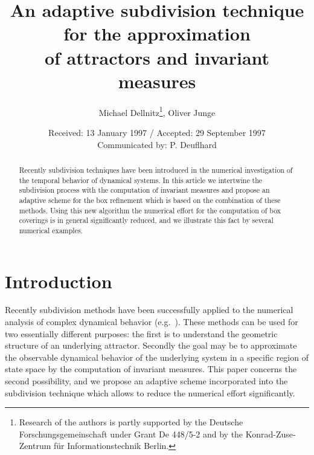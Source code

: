 \documentclass[cvs,envcountsect]{svjour}
\begin{document}
\newcommand{\Ref}[1]{(\ref{#1})}
\newcommand{\R}{{\mathbb R}}
\newcommand{\N}{{\mathbb N}}
\newcommand{\cB}{{\cal B}}
\newcommand{\cM}{{\cal M}}
\newcommand{\diam}{\mathop{\rm diam}\nolimits}

\renewcommand{\labelenumi}{(\roman{enumi})}


\title{An adaptive subdivision technique
        for the approximation\\ of
        attractors and invariant measures}

\author{Michael Dellnitz\thanks{Research of the authors is partly supported
        by the Deutsche Forschungsgemeinschaft under Grant De 448/5-2
        and by the Konrad-Zuse-Zentrum f\"ur Informationstechnik Berlin.},
        Oliver Junge}


\date{Received: 13 January 1997 / Accepted: 29 September 1997 \\[1em]
      Communicated by: P. Deuflhard}

\maketitle

\begin{abstract}
Recently subdivision techniques have been introduced in the
numerical investigation of the temporal behavior of
dynamical systems.  In this article we intertwine the subdivision
process with the computation of invariant measures and propose an
adaptive scheme for the box refinement which is based on the
combination of these methods.  Using this new algorithm the numerical
effort for the computation of box coverings is in general significantly
reduced, and we illustrate this fact by several numerical examples.
\end{abstract}

\section{Introduction}
%
Recently subdivision methods have been successfully applied to the
numerical analysis of complex dynamical behavior
(e.g.\ \cite{Eiden,DH1,DH2,DJ:96,DJchua:97}).  These methods can be used for two
essentially different purposes: the first is to
understand the geometric structure of an underlying attractor.
Secondly the goal may be to approximate the observable dynamical behavior
of the underlying system in a specific region of state space by
the computation of invariant measures.  This paper
concerns the second possibility, and we propose an adaptive scheme
incorporated into the subdivision technique which allows to
reduce the numerical effort significantly.
\end{document}
